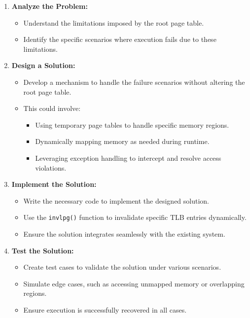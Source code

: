 \documentclass[a4paper,12pt]{report}
\begin{document}
\begin{enumerate}
    \item \textbf{Analyze the Problem:}
    \begin{itemize}
        \item Understand the limitations imposed by the root page table.
        \item Identify the specific scenarios where execution fails due to these limitations.
    \end{itemize}
    \item \textbf{Design a Solution:}
    \begin{itemize}
        \item Develop a mechanism to handle the failure scenarios without altering the root page table.
        \item This could involve:
        \begin{itemize}
            \item Using temporary page tables to handle specific memory regions.
            \item Dynamically mapping memory as needed during runtime.
            \item Leveraging exception handling to intercept and resolve access violations.
        \end{itemize}
    \end{itemize}
    \item \textbf{Implement the Solution:}
    \begin{itemize}
        \item Write the necessary code to implement the designed solution.
        \item Use the \texttt{invlpg()} function to invalidate specific TLB entries dynamically.
        \item Ensure the solution integrates seamlessly with the existing system.
    \end{itemize}
    \item \textbf{Test the Solution:}
    \begin{itemize}
        \item Create test cases to validate the solution under various scenarios.
        \item Simulate edge cases, such as accessing unmapped memory or overlapping regions.
        \item Ensure execution is successfully recovered in all cases.
    \end{itemize}
\end{enumerate}
\end{document}
